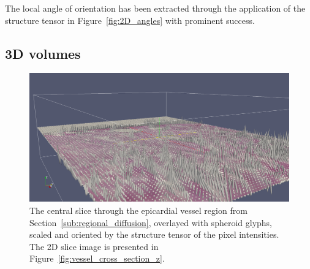     The local angle of orientation has been extracted through the application of the structure tensor in Figure~\ref{fig:2D_angles} with prominent success.
    
  
  \subsection{3D volumes} %
  \label{sub:3d_volumes}
  
  
    \begin{figure}
      \centering
      \includegraphics[width=\textwidth]{Ch7/Figs/structure_tensor_glyphs}
      \caption{The central slice through the epicardial vessel region from Section~\ref{sub:regional_diffusion}, overlayed with spheroid glyphs, scaled and oriented by the structure tensor of the pixel intensities. The 2D slice image is presented in Figure~\ref{fig:vessel_cross_section_z}.}
      \label{fig:structure_tensor_glyphs}
    \end{figure}
    
